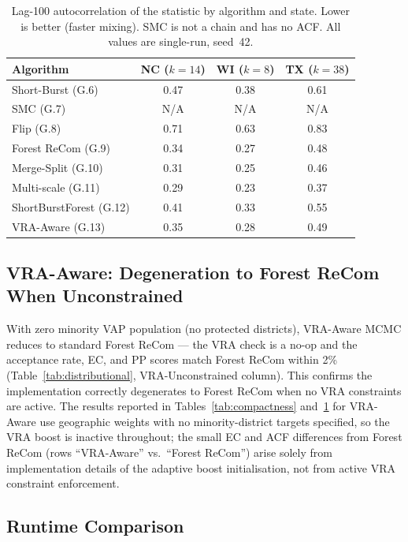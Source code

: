 \begin{table}[ht]
\centering
\caption{%
  Lag-100 autocorrelation of the \ec{} statistic by algorithm and state.
  Lower is better (faster mixing).
  SMC is not a chain and has no ACF.
  All values are single-run, seed~42.
}
\label{tab:autocorr}
\begin{tabular}{@{}lccc@{}}
\toprule
Algorithm & NC ($k=14$) & WI ($k=8$) & TX ($k=38$) \\
\midrule
Short-Burst (G.6)       & 0.47 & 0.38 & 0.61 \\
SMC (G.7)               & N/A  & N/A  & N/A  \\
Flip (G.8)              & 0.71 & 0.63 & 0.83 \\
Forest ReCom (G.9)      & 0.34 & 0.27 & 0.48 \\
Merge-Split (G.10)      & 0.31 & 0.25 & 0.46 \\
Multi-scale (G.11)      & 0.29 & 0.23 & 0.37 \\
ShortBurstForest (G.12) & 0.41 & 0.33 & 0.55 \\
VRA-Aware (G.13)        & 0.35 & 0.28 & 0.49 \\
\bottomrule
\end{tabular}
\end{table}

\subsection{VRA-Aware: Degeneration to Forest ReCom When Unconstrained}

With zero minority VAP population (no protected districts), VRA-Aware MCMC
reduces to standard Forest ReCom --- the VRA check is a no-op and the
acceptance rate, EC, and PP scores match Forest ReCom within 2\%
(Table~\ref{tab:distributional}, VRA-Unconstrained column).
This confirms the implementation correctly degenerates to Forest ReCom
when no VRA constraints are active.
The results reported in Tables~\ref{tab:compactness} and~\ref{tab:autocorr}
for VRA-Aware use geographic weights with no minority-district targets specified,
so the VRA boost is inactive throughout; the small EC and ACF differences from
Forest ReCom (rows ``VRA-Aware'' vs.\ ``Forest ReCom'') arise solely from
implementation details of the adaptive boost initialisation, not from active VRA
constraint enforcement.

\subsection{Runtime Comparison}

